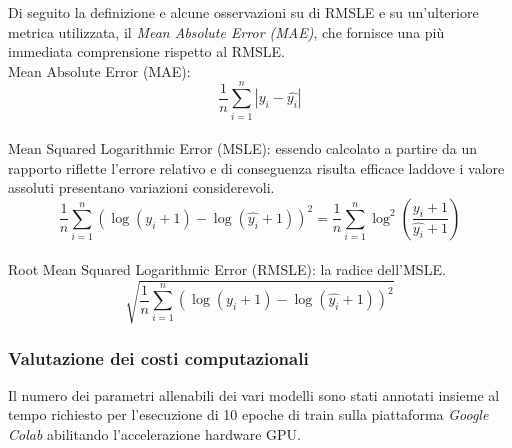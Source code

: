 Di seguito la definizione e alcune osservazioni su di RMSLE e su un'ulteriore
metrica utilizzata, il \textit{Mean Absolute Error (MAE)},
che fornisce una più immediata comprensione rispetto al RMSLE. \\
Mean Absolute Error (MAE):
\begin{equation}
    \frac{1}{n} \sum_{i=1}^{n} | y_i - \hat{y_i} |
\end{equation}
\\
Mean Squared Logarithmic Error (MSLE): essendo calcolato a partire da un
rapporto riflette l'errore relativo e di conseguenza risulta efficace laddove i
valore assoluti presentano variazioni considerevoli.
\begin{equation}
    \frac{1}{n}
        \sum_{i=1}^{n}
            ( \log(y_i+1) - \log(\hat{y_i}+1) )^2
    =
    \frac{1}{n}
        \sum_{i=1}^{n}
            \log^2(\frac{y_i+1}{\hat{y_i}+1})
\end{equation}
\\
Root Mean Squared Logarithmic Error (RMSLE): la radice dell'MSLE.
\begin{equation}
    \sqrt{ 
        \frac{1}{n}
            \sum_{i=1}^{n}
                ( \log(y_i+1) - \log(\hat{y_i}+1) )^2
    }
\end{equation}


\subsubsection{Valutazione dei costi computazionali}

Il numero dei parametri allenabili dei vari modelli sono stati annotati insieme
al tempo richiesto per l'esecuzione di 10 epoche di train sulla piattaforma
\textit{Google Colab} abilitando l'accelerazione hardware GPU.



